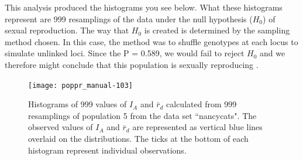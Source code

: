 \documentclass[letterpaper]{article}
\begin{document}
This analysis produced the histograms you see below. What these histograms represent are 999 resamplings of the data under the null hypothesis ($H_0$) of sexual reproduction. The way that $H_0$ is created is determined by the sampling method chosen. In this case, the method was to shuffle genotypes at each locus to simulate unlinked loci. Since the P = 0.589, we would fail to reject $H_0$ and we therefore might conclude that this population is sexually reproducing \cite{Brown:1980} \cite{Smith:1993} \cite{Agapow:2001}.
\begin{figure}[h!]
  \centering
  \caption{\footnotesize Histograms of 999 values of $I_A$ and $\bar{r}_d$ calculated from 999 resamplings of population 5 from the data set ``nancycats". The observed values of $I_A$ and $\bar r_d$ are represented as vertical blue lines overlaid on the distributions. The ticks at the bottom of each histogram represent individual observations.}
  \label{ia_demo_fig}
\texttt{[image: poppr\_manual-103]}
\end{figure}
\end{document}

